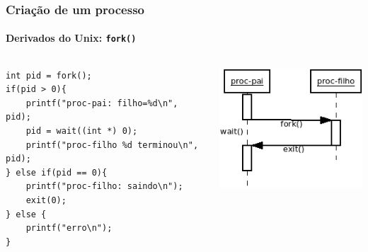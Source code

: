 %
\begin{frame}[fragile]
  \frametitle{Criação de um processo}
  \framesubtitle{Derivados do Unix: \lstinline{fork()}}
  \begin{columns}
    \begin{column}{.6\textwidth}\scriptsize
\begin{lstlisting}
int pid = fork();
if(pid > 0){
    printf("proc-pai: filho=%d\n", pid);
    pid = wait((int *) 0);
    printf("proc-filho %d terminou\n", pid);
} else if(pid == 0){
    printf("proc-filho: saindo\n");
    exit(0);
} else {
    printf("erro\n");
}
      \end{lstlisting}
    \end{column}
    \begin{column}{.4\textwidth}
      \includegraphics[scale=.525]{fork.png}
    \end{column}
  \end{columns}
\end{frame}

